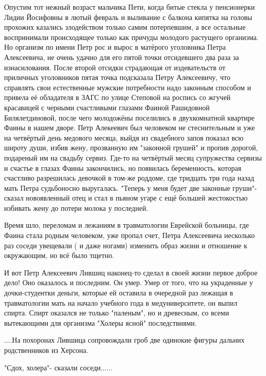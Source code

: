 Опустим тот нежный возраст мальчика Пети, когда  битые стекла у пенсионерки
Лидии Йосифовны в лютый февраль и выливание с балкона кипятка на головы
прохожих казались злодейством только самим потерпевшим, а все остальные
воспринимали происходящее только как причуды молодого растущего организма. Но
организм по имени Петр рос и вырос в матёрого уголовника Петра Алексеевича, не
очень удачно для его пятой точки отсидевшего два раза за изнасилования. После
второй отсидки страдающая от издевательств от  приличных уголовников пятая
точка подсказала Петру Алексеевичу, что справлять свои естественные мужские
потребности надо законным способом и привела её обладателя в ЗАГС по улице
Степовой на роспись со жгучей  красавицей с черными счастливыми глазами Фаиной
Рашидовной Билялетдиновой, после чего молодожёны поселились в двухкомнатной
квартире Фаины в нашем дворе. Петр Алекеевич был человеком не стеснительным и
уже на четвёртый день медового месяца, выйдя из свадебного запоя показал всю
широту души, избив  жену, прозванную им "законной грушей" и пропив  дорогой,
подареный им на свадьбу сервиз. Где-то на четвёртый месяц супружества сервизы и
счастье в глазах Фаины закончились, но появилась беременность, которая
счастливо разрешилась девочкой в том-же роддоме, где тридцать три года назад
мать Петра судьбоносно выругалась. "Теперь у меня будет две законные груши"-
сказал новоявленный отец и стал в пьяном угаре с ещё  большей жестокостью
избивать жену до потери молока у последней. 

Время шло, переломам и лежаниям в травматологии  Еврейской больницы, где Фаина
стала  родным человеком, уже пропал счет, Петра Алексеевича несколько раз
соседи увещевали ( и даже ногами) изменить образ жизни и отношение к
окружающим, но всё было тщетно. 

И вот Петр Алексеевич Лившиц наконец-то сделал в своей жизни первое доброе
дело! Оно оказалось и последним. Он умер. Умер от того, что на украденные у
дочки-студентки деньги, которые ей оставила   в очередной раз лежащая в
травматологии мать на начало учебного года в медуниверситете, он выпил спирта.
Спирт оказался не только "паленым", но и древесным, со всеми вытекающими для
организма "Холеры ясной" последствиями.

....На похоронах Лившица сопровождали гроб две одинокие фигуры дальних
родственников из  Херсона.

"Сдох, холера"- сказали соседи......
